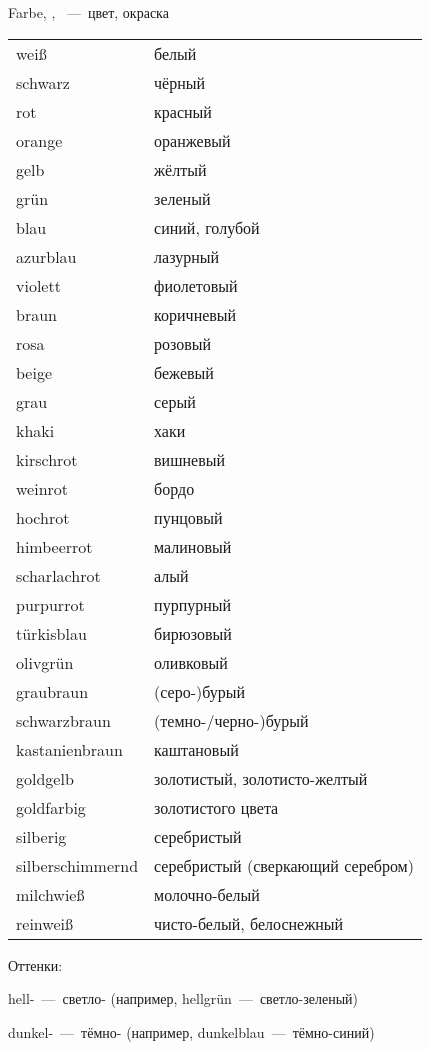 
 Farbe, \Fall{=}, ~---~цвет, окраска

\begin{tabular}{|ll|}
\hline
wei\ss & белый \\
schwarz & чёрный \\
rot & красный \\
orange & оранжевый \\
gelb & жёлтый \\
gr\"un & зеленый \\
blau & синий, голубой \\
azurblau & лазурный \\
violett & фиолетовый \\
braun & коричневый \\
rosa & розовый \\
beige & бежевый \\
grau & серый \\
khaki & хаки \\
kirschrot & вишневый \\
weinrot & бордо \\
hochrot & пунцовый \\
himbeerrot & малиновый \\
scharlachrot & алый \\
purpurrot & пурпурный \\
t\"urkisblau & бирюзовый \\
olivgr\"un & оливковый \\
graubraun & (серо-)бурый \\
schwarzbraun & (темно-/черно-)бурый \\
kastanienbraun & каштановый \\
goldgelb & золотистый, золотисто-желтый \\
goldfarbig & золотистого цвета \\
silberig & серебристый \\
silberschimmernd & серебристый (сверкающий серебром) \\
milchwie\ss & молочно-белый \\
reinwei\ss & чисто-белый, белоснежный \\
\hline
\end{tabular}

Оттенки:

hell-~---~светло- (например, hellgr\"un~---~светло-зеленый)

dunkel-~---~тёмно- (например, dunkelblau~---~тёмно-синий)
